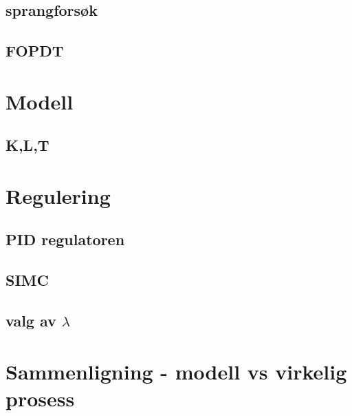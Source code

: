 \documentclass{minmal}
\begin{document}
\subsection{sprangforsøk}

\subsection{FOPDT}

\section{Modell}

\subsection{K,L,T}

\section{Regulering}

\subsection{PID regulatoren}

\subsection{SIMC}

\subsection{valg av $\lambda$}

\section{Sammenligning - modell vs virkelig prosess}
\end{document}
